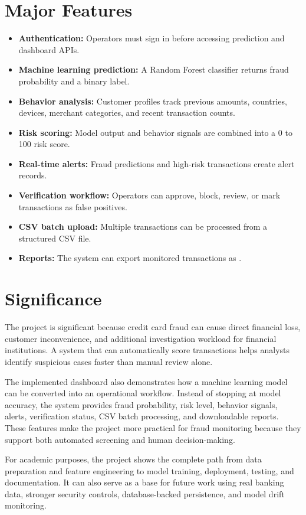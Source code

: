 \documentclass[12pt,a4paper]{report}
\begin{document}
\section{Major Features}
\begin{itemize}
    \item \textbf{Authentication:} Operators must sign in before accessing prediction and dashboard APIs.
    \item \textbf{Machine learning prediction:} A Random Forest classifier returns fraud probability and a binary label.
    \item \textbf{Behavior analysis:} Customer profiles track previous amounts, countries, devices, merchant categories, and recent transaction counts.
    \item \textbf{Risk scoring:} Model output and behavior signals are combined into a 0 to 100 risk score.
    \item \textbf{Real-time alerts:} Fraud predictions and high-risk transactions create alert records.
    \item \textbf{Verification workflow:} Operators can approve, block, review, or mark transactions as false positives.
    \item \textbf{CSV batch upload:} Multiple transactions can be processed from a structured CSV file.
    \item \textbf{Reports:} The system can export monitored transactions as .
\end{itemize}

\section{Significance}
The project is significant because credit card fraud can cause direct financial loss, customer inconvenience, and additional investigation workload for financial institutions. A system that can automatically score transactions helps analysts identify suspicious cases faster than manual review alone.

The implemented dashboard also demonstrates how a machine learning model can be converted into an operational workflow. Instead of stopping at model accuracy, the system provides fraud probability, risk level, behavior signals, alerts, verification status, CSV batch processing, and downloadable reports. These features make the project more practical for fraud monitoring because they support both automated screening and human decision-making.

For academic purposes, the project shows the complete path from data preparation and feature engineering to model training, deployment, testing, and documentation. It can also serve as a base for future work using real banking data, stronger security controls, database-backed persistence, and model drift monitoring.
\end{document}
